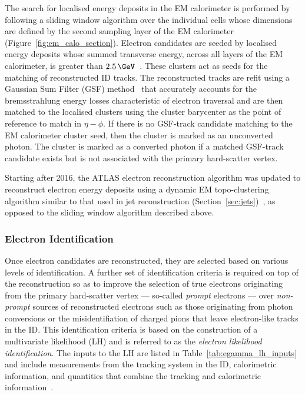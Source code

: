 The search for localised energy deposits in the EM calorimeter is performed
by following a sliding window algorithm over the individual cells whose dimensions are
defined by the second sampling layer of the EM calorimeter (Figure~\ref{fig:em_calo_section}).
Electron candidates are seeded by localised energy deposits whose summed transverse energy,
across all layers of the EM calorimeter, is greater than $2.5\,\GeV$~\cite{Aaboud:2657964}.
These clusters act as seeds for the matching of reconstructed ID tracks.
The reconstructed tracks are refit using a Gaussian Sum Filter (GSF) method~\cite{ATLAS-CONF-2012-047} 
that accurately accounts for the bremsstrahlung energy losses characteristic of
electron traversal and are then matched to the localised clusters using
the cluster barycenter as the point of reference to match in $\eta-\phi$.
If there is no GSF-track candidate matching to the EM calorimeter cluster seed, then
the cluster is marked as an unconverted photon. The cluster is marked as a
converted photon if a matched GSF-track candidate exists but is not associated
with the primary hard-scatter vertex.

Starting after 2016, the ATLAS electron reconstruction algorithm was updated to reconstruct
electron energy deposits using a dynamic EM topo-clustering algorithm similar to that used
in jet reconstruction (Section~\ref{sec:jets})~\cite{Aad:2019tso}, as opposed to the sliding window
algorithm described above.


\subsubsection{Electron Identification}
\label{sec:electron_id}

Once electron candidates are reconstructed, they are selected based on various
levels of identification.
A further set of identification criteria is required on top of the reconstruction
so as to improve the selection of true electrons originating from the primary hard-scatter
vertex --- so-called \textit{prompt} electrons --- over \textit{non-prompt} sources
of reconstructed electrons such as those originating from photon conversions or the misidentifiation
of charged pions that leave electron-like tracks in the ID.
This identification criteria is based on the construction of a multivariate likelihood (LH) and
is referred to as the \textit{electron likelihood identification}.
The inputs to the LH are listed in Table~\ref{tab:egamma_lh_inputs} and include measurements from the tracking system in the ID,
calorimetric information, and quantities that combine the tracking and calorimetric information~\cite{Aad:2019tso}.

